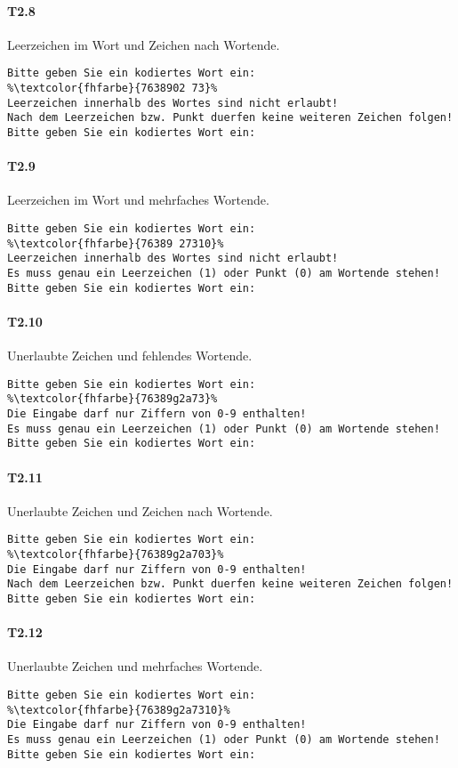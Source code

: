 \paragraph*{T2.8} Leerzeichen im Wort und Zeichen nach Wortende.
\begin{lstlisting}[escapechar=\%]
Bitte geben Sie ein kodiertes Wort ein:
%\textcolor{fhfarbe}{7638902 73}%
Leerzeichen innerhalb des Wortes sind nicht erlaubt!
Nach dem Leerzeichen bzw. Punkt duerfen keine weiteren Zeichen folgen!
Bitte geben Sie ein kodiertes Wort ein:
\end{lstlisting}

\paragraph*{T2.9} Leerzeichen im Wort und mehrfaches Wortende.
\begin{lstlisting}[escapechar=\%]
Bitte geben Sie ein kodiertes Wort ein:
%\textcolor{fhfarbe}{76389 27310}%
Leerzeichen innerhalb des Wortes sind nicht erlaubt!
Es muss genau ein Leerzeichen (1) oder Punkt (0) am Wortende stehen!
Bitte geben Sie ein kodiertes Wort ein:
\end{lstlisting}

\paragraph*{T2.10} Unerlaubte Zeichen und fehlendes Wortende.
\begin{lstlisting}[escapechar=\%]
Bitte geben Sie ein kodiertes Wort ein:
%\textcolor{fhfarbe}{76389g2a73}%
Die Eingabe darf nur Ziffern von 0-9 enthalten!
Es muss genau ein Leerzeichen (1) oder Punkt (0) am Wortende stehen!
Bitte geben Sie ein kodiertes Wort ein:
\end{lstlisting}

\paragraph*{T2.11} Unerlaubte Zeichen und Zeichen nach Wortende.
\begin{lstlisting}[escapechar=\%]
Bitte geben Sie ein kodiertes Wort ein:
%\textcolor{fhfarbe}{76389g2a703}%
Die Eingabe darf nur Ziffern von 0-9 enthalten!
Nach dem Leerzeichen bzw. Punkt duerfen keine weiteren Zeichen folgen!
Bitte geben Sie ein kodiertes Wort ein:
\end{lstlisting}

\paragraph*{T2.12} Unerlaubte Zeichen und mehrfaches Wortende.
\begin{lstlisting}[escapechar=\%]
Bitte geben Sie ein kodiertes Wort ein:
%\textcolor{fhfarbe}{76389g2a7310}%
Die Eingabe darf nur Ziffern von 0-9 enthalten!
Es muss genau ein Leerzeichen (1) oder Punkt (0) am Wortende stehen!
Bitte geben Sie ein kodiertes Wort ein:
\end{lstlisting}

